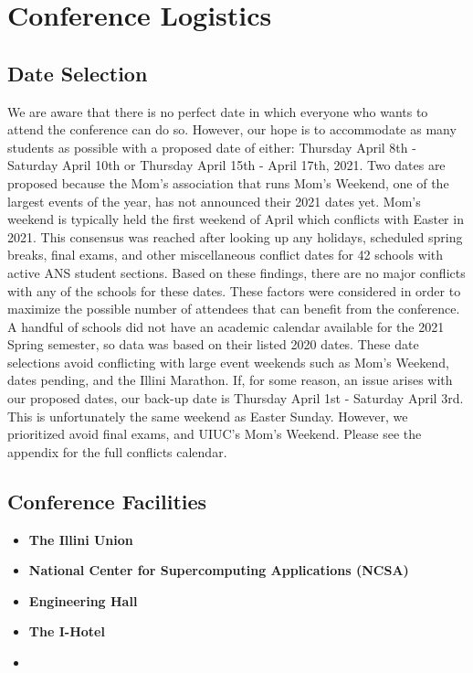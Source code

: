 \documentclass[12pt, letterpaper]{article}
\begin{document}
\newpage
\section{Conference Logistics}

\subsection{Date Selection}
We are aware that there is no perfect date in which everyone who wants to attend the conference can do so. However, our hope is to accommodate as many students as possible with a proposed date of either: Thursday April 8th - Saturday April 10th or Thursday April 15th - April 17th, 2021. Two dates are proposed because the Mom's association that runs Mom's Weekend, one of the largest events of the year, has not announced their 2021 dates yet. Mom's weekend is typically held the first weekend of April which conflicts with Easter in 2021. This consensus was reached after looking up any holidays, scheduled spring breaks, final exams, and other miscellaneous conflict dates for 42 schools with active ANS student sections. Based on these findings, there are no major conflicts with any of the schools for these dates. These factors were considered in order to maximize the possible number of attendees that can benefit from the conference. A handful of schools did not have an academic calendar available for the 2021 Spring semester, so data was based on their listed 2020 dates. These date selections avoid conflicting with large event weekends such as Mom's Weekend, dates pending, and the Illini Marathon. If, for some reason, an issue arises with our proposed dates, our back-up date is Thursday April 1st - Saturday April 3rd. This is unfortunately the same weekend as Easter Sunday. However, we prioritized avoid final exams, and UIUC’s Mom’s Weekend. Please see the appendix for the full conflicts calendar.

\subsection{Conference Facilities}
\begin{itemize}
  \item \textbf{The Illini Union}\\
  \item \textbf{National Center for Supercomputing Applications (NCSA)}\\
  \item \textbf{Engineering Hall}\\
  \item \textbf{The I-Hotel}\\
  \item \textbf{}\\
\end{itemize}
\end{document}
